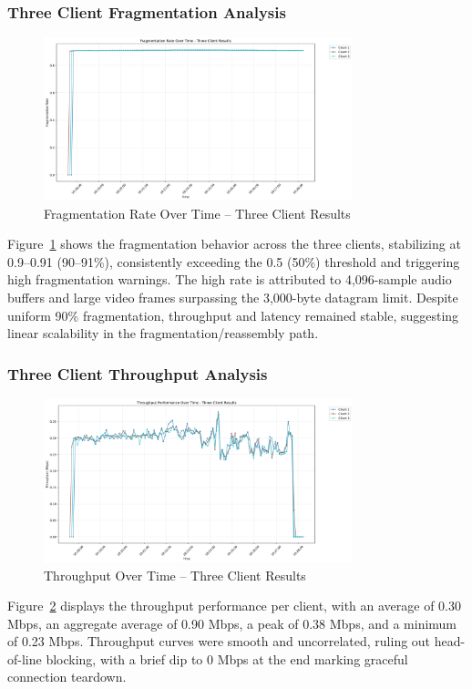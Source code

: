 \subsubsection{Three Client Fragmentation Analysis}
\begin{figure}[h!]
\centering
\includegraphics[width=0.8\textwidth]{Evaluation/fragmentation_by_client_three-client-results.png}
\caption{Fragmentation Rate Over Time – Three Client Results}
\label{fig:fragmentation-three-clients}
\end{figure}
Figure~\ref{fig:fragmentation-three-clients} shows the fragmentation behavior across the three clients, stabilizing at 0.9–0.91 (90–91\%), consistently exceeding the 0.5 (50\%) threshold and triggering high fragmentation warnings. The high rate is attributed to 4,096-sample audio buffers and large video frames surpassing the 3,000-byte datagram limit. Despite uniform 90\% fragmentation, throughput and latency remained stable, suggesting linear scalability in the fragmentation/reassembly path.


\subsubsection{Three Client Throughput Analysis}
\begin{figure}[h!]
\centering
\includegraphics[width=0.8\textwidth]{Evaluation/throughput_by_client_three-client-results.png}
\caption{Throughput Over Time – Three Client Results}
\label{fig:throughput-three-clients}
\end{figure}
Figure~\ref{fig:throughput-three-clients} displays the throughput performance per client, with an average of 0.30 Mbps, an aggregate average of 0.90 Mbps, a peak of 0.38 Mbps, and a minimum of 0.23 Mbps. Throughput curves were smooth and uncorrelated, ruling out head-of-line blocking, with a brief dip to 0 Mbps at the end marking graceful connection teardown.

